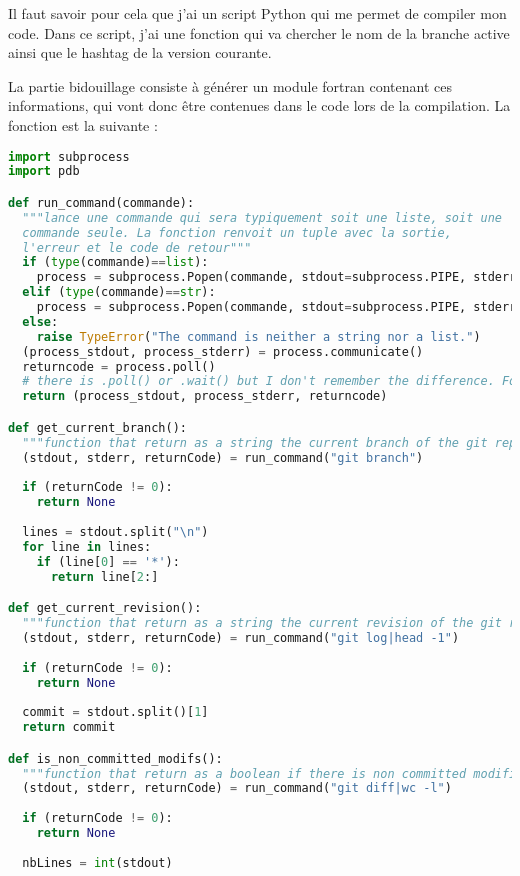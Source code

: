 Il faut savoir pour cela que j'ai un script Python qui me permet de compiler mon code. Dans ce script, j'ai une fonction qui va chercher le nom de la branche active ainsi que le hashtag de la version courante. 

La partie bidouillage consiste à générer un module fortran contenant ces informations, qui vont donc être contenues dans le code lors de la compilation. La fonction est la suivante :
\begin{lstlisting}[language=python]
import subprocess
import pdb

def run_command(commande):
  """lance une commande qui sera typiquement soit une liste, soit une 
  commande seule. La fonction renvoit un tuple avec la sortie, 
  l'erreur et le code de retour"""
  if (type(commande)==list):
    process = subprocess.Popen(commande, stdout=subprocess.PIPE, stderr=subprocess.PIPE)
  elif (type(commande)==str):
    process = subprocess.Popen(commande, stdout=subprocess.PIPE, stderr=subprocess.PIPE, shell=True)
  else:
    raise TypeError("The command is neither a string nor a list.")
  (process_stdout, process_stderr) = process.communicate()
  returncode = process.poll()
  # there is .poll() or .wait() but I don't remember the difference. For some kind of things, one of the two was not working
  return (process_stdout, process_stderr, returncode)

def get_current_branch():
  """function that return as a string the current branch of the git repository"""
  (stdout, stderr, returnCode) = run_command("git branch")
  
  if (returnCode != 0):
    return None
  
  lines = stdout.split("\n")
  for line in lines:
    if (line[0] == '*'):
      return line[2:]

def get_current_revision():
  """function that return as a string the current revision of the git repository"""
  (stdout, stderr, returnCode) = run_command("git log|head -1")
  
  if (returnCode != 0):
    return None
  
  commit = stdout.split()[1]
  return commit

def is_non_committed_modifs():
  """function that return as a boolean if there is non committed modifications in the repository"""
  (stdout, stderr, returnCode) = run_command("git diff|wc -l")
  
  if (returnCode != 0):
    return None
  
  nbLines = int(stdout)
  

\end{lstlisting}
